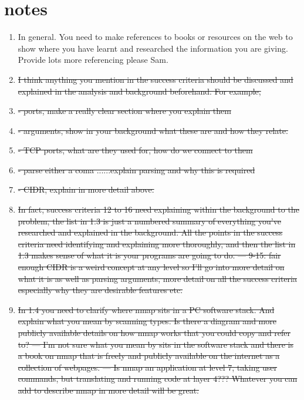 \documentclass{article}
\begin{document}
\section{notes}
\begin{enumerate}
  \item{In general. You need to make references to books or resources on the web to show where you have learnt and researched the information you are giving. Provide lots more referencing please Sam. }
  \item{\sout{I think anything you mention in the success criteria should be discussed and explained in the analysis and background beforehand. For example, }}
  \item{\sout{- ports, make a really clear section where you explain them }}
  \item{\sout{- arguments, show in your background what these are and how they relate. }}
  \item{\sout{- TCP ports, what are they used for, how do we connect to them}}
  \item{\sout{- parse either a coma ......explain parsing and why this is required}}
  \item{\sout{- CIDR, explain in more detail above. }}
  \item{\sout{In fact, success criteria 12 to 16 need explaining within the background to the problem, the list in 1.3 is just a numbered summary of everything you’ve researched and explained in the background. All the points in the success criteria need identifying and explaining more thoroughly, and then the list in 1.3 makes sense of what it is your programs are going to do. --- 9-15: fair enough CIDR is a weird concept at any level so I'll go into more detail on what it is as well as parsing arguments, more detail on all the success criteria especially why they are desirable features etc.}}
  \item{\sout{In 1.4 you need to clarify where nmap sits in a PC software stack. And explain what you mean by scanning types. Is there a diagram and more publicly available details on how nmap works that you could copy and refer to? --- I'm not sure what you mean by sits in the software stack and there is a book on nmap that is freely and publicly available on the internet as a collection of webpages. --- Is nmap an application at level 7, taking user commands, but translating and running code at layer 4??? Whatever you can add to describe nmap in more detail will be great.}}

\end{enumerate}
\end{document}
